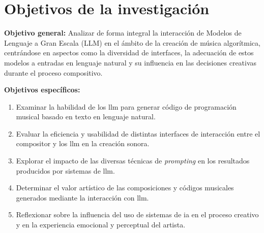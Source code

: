 \section{Objetivos de la investigación}



\textbf{Objetivo general:} Analizar de forma integral la interacción de Modelos de Lenguaje a Gran Escala (LLM) en el ámbito de la creación de música algorítmica, centrándose en aspectos como la diversidad de interfaces, la adecuación de estos modelos a entradas en lenguaje natural y su influencia en las decisiones creativas durante el proceso compositivo.

\textbf{Objetivos específicos:}
\begin{enumerate}[label=\alph*)]
    \item Examinar la habilidad de los \gls{llm} para generar código de programación musical basado en texto en lenguaje natural.
    \item Evaluar la eficiencia y usabilidad de distintas interfaces de interacción entre el compositor y los \gls{llm} en la creación sonora.
    \item Explorar el impacto de las diversas técnicas de \emph{prompting} en los resultados producidos por sistemas de \gls{llm}.
    \item Determinar el valor artístico de las composiciones y códigos musicales generados mediante la interacción con \gls{llm}.
    \item Reflexionar sobre la influencia del uso de sistemas de \gls{ia} en el proceso creativo y en la experiencia emocional y perceptual del artista.
\end{enumerate}

